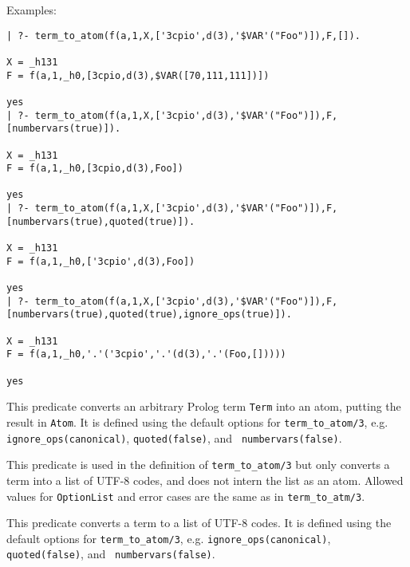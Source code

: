 \begin{description}
Examples:
{\footnotesize
\begin{verbatim}
| ?- term_to_atom(f(a,1,X,['3cpio',d(3),'$VAR'("Foo")]),F,[]).

X = _h131
F = f(a,1,_h0,[3cpio,d(3),$VAR([70,111,111])])

yes
| ?- term_to_atom(f(a,1,X,['3cpio',d(3),'$VAR'("Foo")]),F,[numbervars(true)]).

X = _h131
F = f(a,1,_h0,[3cpio,d(3),Foo])

yes
| ?- term_to_atom(f(a,1,X,['3cpio',d(3),'$VAR'("Foo")]),F,[numbervars(true),quoted(true)]).

X = _h131
F = f(a,1,_h0,['3cpio',d(3),Foo])

yes
| ?- term_to_atom(f(a,1,X,['3cpio',d(3),'$VAR'("Foo")]),F,[numbervars(true),quoted(true),ignore_ops(true)]).

X = _h131
F = f(a,1,_h0,'.'('3cpio','.'(d(3),'.'(Foo,[]))))

yes
\end{verbatim}}

%
This predicate converts an arbitrary Prolog term {\tt Term} into an
atom, putting the result in {\tt Atom}.  It is defined using the
default options for {\tt term\_to\_atom/3}, e.g. {\tt
ignore\_ops(canonical)}, {\tt quoted(false)}, and {\tt
numbervars(false)}.

%
This predicate is used in the definition of {\tt term\_to\_atom/3} but
only converts a term into a list of UTF-8 codes, and does not intern
the list as an atom.  Allowed values for {\tt OptionList} and error
cases are the same as in {\tt term\_to\_atm/3}.

%
This predicate converts a term to a list of UTF-8 codes.  It is
defined using the default options for {\tt term\_to\_atom/3},
e.g. {\tt ignore\_ops(canonical)}, {\tt quoted(false)}, and {\tt
  numbervars(false)}.


\end{description}
